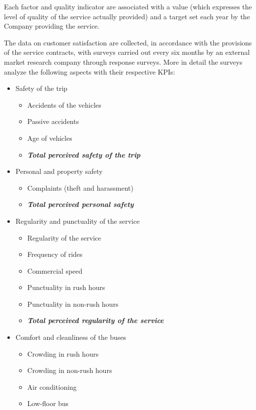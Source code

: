 Each factor and quality indicator are associated with a value (which expresses the level of quality of the service actually provided) and a target set each year by the Company providing the service.

The data on customer satisfaction are collected, in accordance with the provisions of the service contracts, with surveys carried out every six months by an external market research company through response surveys. 
\newpage
More in detail the surveys  analyze the following aspects with their respective KPIs:
\begin{itemize}
    \item {Safety of the trip}
\begin{itemize}
    \item Accidents of the vehicles
    \item Passive accidents
    \item Age of vehicles
    \item \textit{\textbf{Total perceived safety of the trip}}
\end{itemize}
    \item Personal and property safety
    \begin{itemize}
        \item	Complaints (theft and harassment)
        \item \textit{\textbf{Total perceived personal safety}}
    \end{itemize}
    \item Regularity and punctuality of the service
    \begin{itemize}
        \item Regularity of the service
        \item Frequency of rides
        \item Commercial speed
        \item Punctuality in rush hours
        \item Punctuality in non-rush hours
        \item \textit{\textbf{Total perceived regularity of the service}}
    \end{itemize}
    \item	Comfort and cleanliness of the buses
    \begin{itemize}
        \item Crowding in rush hours 
        \item Crowding in non-rush hours 
        \item Air conditioning
        \item Low-floor bus

\end{itemize}
\end{itemize}
